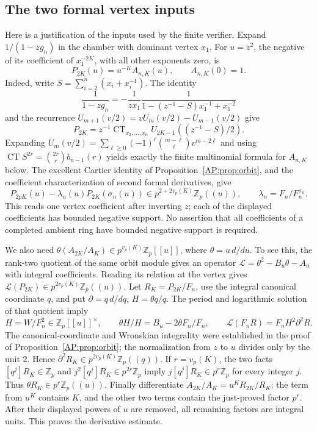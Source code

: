 \documentclass[11pt,a4paper]{article}
\theoremstyle{definition}\newtheorem{definition}[theorem]{Definition}
\theoremstyle{remark}\newtheorem{remark}[theorem]{Remark}
\numberwithin{equation}{section}
\begin{document}
\subsection{The two formal vertex inputs}
Here is a justification of the inputs used by the finite verifier.
Expand $1/(1-zg_n)$ in the chamber with dominant vertex $x_1$.
For $u=z^2$, the negative of its coefficient of $x_1^{-2K}$, with
all other exponents zero, is
\[
 P_{2K}(u)=u^{-K}A_{n,K}(u),\qquad A_{n,K}(0)=1.
\]
Indeed, write $S=\sum_{i=2}^n(x_i+x_i^{-1})$.  The identity
\[
 \frac1{1-zg_n}=-\frac1{zx_1}
 \frac1{1-(z^{-1}-S)x_1^{-1}+x_1^{-2}}
\]
and the recurrence $U_{m+1}(v/2)=vU_m(v/2)-U_{m-1}(v/2)$ give
\[
 P_{2K}=z^{-1}\operatorname{CT}_{x_2,\ldots,x_n}
 U_{2K-1}((z^{-1}-S)/2).
\]
Expanding
$U_m(v/2)=\sum_{\ell\geq0}(-1)^\ell\binom{m-\ell}{\ell}v^{m-2\ell}$
and using $\operatorname{CT}S^{2r}=\binom{2r}r b_{n-1}(r)$ yields
exactly the finite multinomial formula for $A_{n,K}$ below.
The excellent Cartier identity of
Proposition~\ref{AP:prop:orbit}, and the coefficient characterization of
second formal derivatives, give
\begin{equation}\label{AP:eq:vertex5}
 P_{2pK}(u)-\lambda_n(u)P_{2K}(\sigma_n(u))
        \in p^{2+2v_p(K)}\mathbb Z_p((u)),\qquad
 \lambda_n=F_n/F_n^{\sigma_n}.
\end{equation}
This reads one vertex coefficient after inverting $z$; each of the
displayed coefficients has bounded negative support.  No assertion
that all coefficients of a completed ambient ring have bounded
negative support is required.

We also need $\theta(A_{2K}/A_K)\in p^{v_p(K)}\mathbb Z_p[[u]]$,
where $\theta=u\,d/du$.  To see this, the rank-two quotient of the
same orbit module gives an operator
$\mathcal L=\theta^2-B_u\theta-A_u$ with integral coefficients.
Reading its relation at the vertex gives
$\mathcal L(P_{2K})\in p^{2v_p(K)}\mathbb Z_p((u))$.
Let $R_K=P_{2K}/F_n$, use the integral canonical coordinate $q$, and
put $\partial=q\,d/dq$, $H=\theta q/q$.  The period and logarithmic
solution of that quotient imply
\[
 H=W/F_n^2\in\mathbb Z_p[[u]]^\times,\qquad
 \theta H/H=B_u-2\theta F_n/F_n,\qquad
 \mathcal L(F_nR)=F_nH^2\partial^2R.
\]
The canonical-coordinate and Wronskian integrality were established
in the proof of Proposition~\ref{AP:prop:orbit}; the normalization from
$z$ to $u$ divides only by the unit $2$.  Hence
$\partial^2R_K\in p^{2v_p(K)}\mathbb Z_p((q))$.
If $r=v_p(K)$, the two facts
$[q^j]R_K\in\mathbb Z_p$ and $j^2[q^j]R_K\in p^{2r}\mathbb Z_p$
imply $j[q^j]R_K\in p^r\mathbb Z_p$ for every integer $j$.
Thus $\theta R_K\in p^r\mathbb Z_p((u))$.
Finally differentiate
$A_{2K}/A_K=u^KR_{2K}/R_K$: the term from $u^K$ contains $K$,
and the other two terms contain the just-proved factor $p^r$.
After their displayed powers of $u$ are removed, all remaining
factors are integral units.  This proves the derivative estimate.
\end{document}
